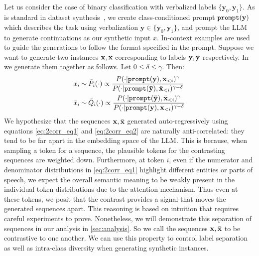 \subsection{\corrsyn}
\label{sec:corrsyn-intro}
Let us consider the case of binary classification with verbalized labels $\{\mathbf{y}_0,\mathbf{y}_1\}$. As is standard in dataset synthesis~\cite{ye2022zerogen,gpt3}, we create class-conditioned prompt $\mathtt{prompt}(\mathbf{y})$ which describes the task using verbalization $\mathbf{y}\in\{\mathbf{y}_0,\mathbf{y}_1\}$, and prompt the LLM to generate continuations as our synthetic input $x$. In-context examples are used to guide the generations to follow the format specified in the prompt. %
Suppose we want to generate two instances $\mathbf{x},\bar{\mathbf{x}}$ corresponding to labels $\mathbf{y}, \bar{\mathbf{y}}$ respectively. In \corrsyn we generate them together as follows. Let $0\leq \delta\leq \gamma$. Then:
\begin{align}
    & x_i \mathbin{\overset{}{\kern0pt\sim}}  \tilde {P}_i(\cdot) \propto \frac{P(\cdot|\mathtt{prompt}(\mathbf{y}),\mathbf{x}_{<i})^\gamma}{P(\cdot|\mathtt{prompt}(\mathbf{\bar{\mathbf{y}}}),\bar{\mathbf{x}}_{<i})^{\gamma-\delta}} \label{eq:2corr_eq1}\\
   & \bar{x}_i  \mathbin{\overset{}{\kern0pt\sim}} \tilde Q_i(\cdot) \propto \frac{P(\cdot|\mathtt{prompt}(\mathbf{\bar{\mathbf{y}}}),\bar{\mathbf{x}}_{<i})^\gamma}{P(\cdot|\mathtt{prompt}(\mathbf{y}),\mathbf{x}_{<i})^{\gamma-\delta}} \label{eq:2corr_eq2}
\end{align}
We hypothesize that the sequences $\mathbf{x}, \bar{\mathbf{x}}$ generated auto-regressively using equations \eqref{eq:2corr_eq1} and \eqref{eq:2corr_eq2} are naturally anti-correlated: they tend to be far apart in the embedding space of the LLM. This is because, when sampling a token  for a sequence, the plausible tokens for the contrasting sequences are weighted down. Furthermore, at token $i$, even if the numerator and denominator distributions in \eqref{eq:2corr_eq1} highlight different entities or parts of speech, we expect the overall semantic meaning to be weakly present in the individual token distributions due to the attention mechanism. Thus even at these tokens, we posit that the contrast provides a signal that moves the generated sequences apart. This reasoning is based on intuition that requires careful experiments to prove. Nonetheless, we will demonstrate this separation of sequences in our analysis in \autoref{sec:analysis}. So we call the sequences $\mathbf{x},\bar{\mathbf{x}}$ to be contrastive to one another. We can use this property to control label separation as well as intra-class diversity when generating synthetic instances.

